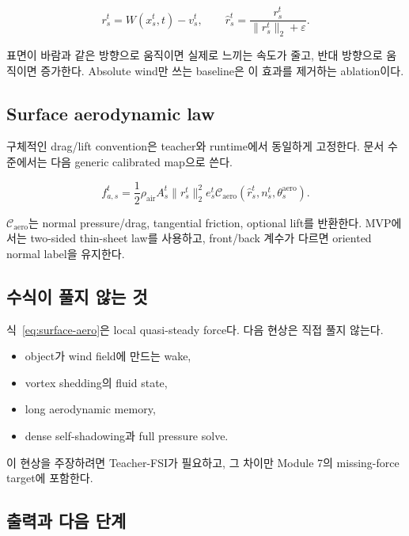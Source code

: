 \documentclass[11pt,a4paper]{article}
\newcommand{\eps}{\varepsilon}
\begin{document}
\begin{equation}
  r_s^t
  =
  W(x_s^t,t)-v_s^t,
  \qquad
  \widehat r_s^t
  =
  \frac{r_s^t}{\|r_s^t\|_2+\eps}.
  \label{eq:relative-wind}
\end{equation}

표면이 바람과 같은 방향으로 움직이면 실제로 느끼는 속도가 줄고,
반대 방향으로 움직이면 증가한다.
Absolute wind만 쓰는 baseline은 이 효과를 제거하는 ablation이다.

\subsection*{Surface aerodynamic law}

구체적인 drag/lift convention은 teacher와 runtime에서 동일하게 고정한다.
문서 수준에서는 다음 generic calibrated map으로 쓴다.

\begin{equation}
  f_{a,s}^t
  =
  \frac12\rho_{\mathrm{air}}
  A_s^t
  \|r_s^t\|_2^2
  e_s^t
  \mathcal C_{\mathrm{aero}}
  \left(
    \widehat r_s^t,n_s^t,
    \theta_s^{\mathrm{aero}}
  \right).
  \label{eq:surface-aero}
\end{equation}

\(\mathcal C_{\mathrm{aero}}\)는 normal pressure/drag,
tangential friction, optional lift를 반환한다.
MVP에서는 two-sided thin-sheet law를 사용하고,
front/back 계수가 다르면 oriented normal label을 유지한다.

\subsection*{수식이 풀지 않는 것}

식~\eqref{eq:surface-aero}은 local quasi-steady force다.
다음 현상은 직접 풀지 않는다.

\begin{itemize}[leftmargin=1.5em]
  \item object가 wind field에 만드는 wake,
  \item vortex shedding의 fluid state,
  \item long aerodynamic memory,
  \item dense self-shadowing과 full pressure solve.
\end{itemize}

이 현상을 주장하려면 Teacher-FSI가 필요하고,
그 차이만 Module 7의 missing-force target에 포함한다.

\subsection*{출력과 다음 단계}
\end{document}
